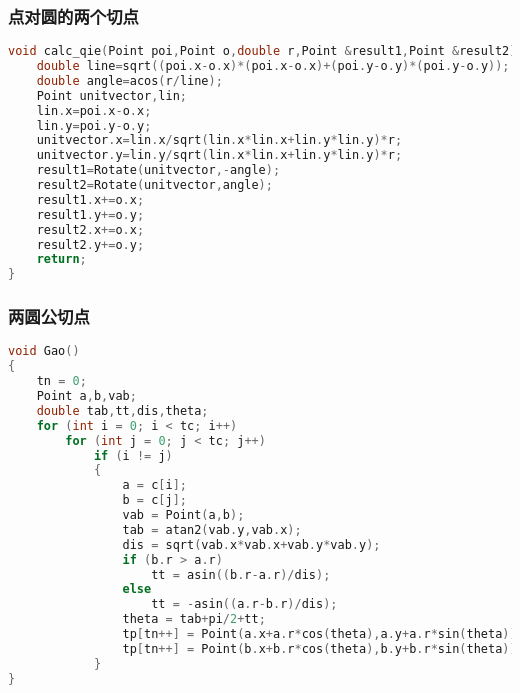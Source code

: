 	\subsubsection{点对圆的两个切点}
	\begin{lstlisting}[language=c++]
void calc_qie(Point poi,Point o,double r,Point &result1,Point &result2) {
	double line=sqrt((poi.x-o.x)*(poi.x-o.x)+(poi.y-o.y)*(poi.y-o.y));
	double angle=acos(r/line);
	Point unitvector,lin;
	lin.x=poi.x-o.x;
	lin.y=poi.y-o.y;
	unitvector.x=lin.x/sqrt(lin.x*lin.x+lin.y*lin.y)*r;
	unitvector.y=lin.y/sqrt(lin.x*lin.x+lin.y*lin.y)*r;
	result1=Rotate(unitvector,-angle);
	result2=Rotate(unitvector,angle);
	result1.x+=o.x;
	result1.y+=o.y;
	result2.x+=o.x;
	result2.y+=o.y;
	return;
}
	\end{lstlisting}
	
	\subsubsection{两圆公切点}
	\begin{lstlisting}[language=c++]
void Gao()
{
	tn = 0;
	Point a,b,vab;
	double tab,tt,dis,theta;
	for (int i = 0; i < tc; i++)
		for (int j = 0; j < tc; j++)
			if (i != j)
			{
				a = c[i];
				b = c[j];
				vab = Point(a,b);
				tab = atan2(vab.y,vab.x);
				dis = sqrt(vab.x*vab.x+vab.y*vab.y);
				if (b.r > a.r)
					tt = asin((b.r-a.r)/dis);
				else
					tt = -asin((a.r-b.r)/dis);
				theta = tab+pi/2+tt;
				tp[tn++] = Point(a.x+a.r*cos(theta),a.y+a.r*sin(theta));
				tp[tn++] = Point(b.x+b.r*cos(theta),b.y+b.r*sin(theta));
			}
}
	\end{lstlisting}